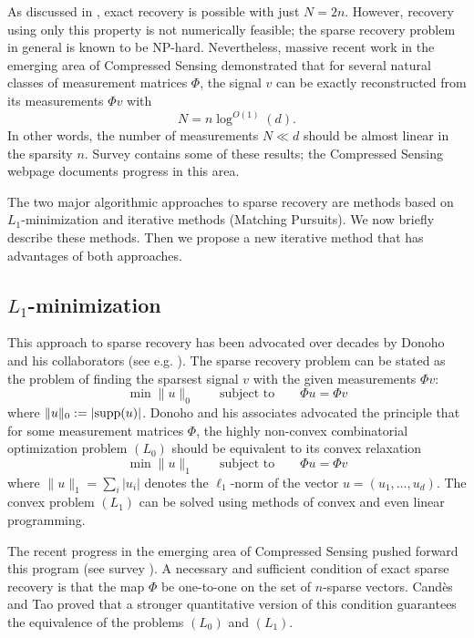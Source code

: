 \documentclass[12pt]{amsart}
\theoremstyle{plain}
\theoremstyle{definition}
\theoremstyle{remark}
\numberwithin{equation}{section}
\begin{document}
As discussed in \cite{CDD}, exact recovery is possible with just $N=2n$. However,
recovery using only this property is not numerically feasible; the sparse recovery 
problem in general is known to be NP-hard.
Nevertheless, massive recent work in the emerging area of Compressed Sensing 
demonstrated that for several natural classes of measurement matrices $\Phi$, 
the signal $v$ can be exactly reconstructed from its measurements $\Phi v$ with
\begin{equation}                    \label{N}
  N = n \log^{O(1)} (d).
\end{equation}
In other words, the number of measurements $N \ll d$ should be almost linear in 
the sparsity $n$. 
Survey \cite{C} contains some of these results; 
the Compressed Sensing webpage \cite{CS webpage} documents progress in this area.

The two major algorithmic approaches to sparse recovery are methods
based on $L_1$-minimization and iterative methods (Matching Pursuits).
We now briefly describe these methods. Then we propose a new iterative method
that has advantages of both approaches.

\subsection{$L_1$-minimization}

This approach to sparse recovery has been advocated over decades by Donoho and his 
collaborators (see e.g. \cite{D}). 
The sparse recovery problem can be stated as the problem of finding 
the sparsest signal $v$ with the given measurements $\Phi v$:
\begin{equation}                    \tag{$L_0$}
  \min \|u\|_0 \qquad \text{subject to} \qquad \Phi u = \Phi v
\end{equation}
where $\|u\|_0 := |{{\rm supp}}(u)|$.
Donoho and his associates advocated the principle
that for some measurement matrices $\Phi$, the highly non-convex 
combinatorial optimization problem $(L_0)$ should be equivalent 
to its convex relaxation 
\begin{equation}                    \tag{$L_1$}
  \min \|u\|_1 \qquad \text{subject to} \qquad \Phi u = \Phi v
\end{equation}
where $\|u\|_1 = \sum_i |u_i|$ denotes the $\ell_1$-norm of the vector
$u = (u_1,\ldots,u_d)$. The convex problem $(L_1)$ can be solved using 
methods of convex and even linear programming. 

The recent progress in the emerging area of Compressed Sensing pushed forward
this program (see survey \cite{C}). A necessary and sufficient
condition of exact sparse recovery is that the map $\Phi$ be one-to-one on the set of  
$n$-sparse vectors. Cand\`es and Tao \cite{CT decoding} proved that a stronger
quantitative version of this condition guarantees the equivalence 
of the problems $(L_0)$ and $(L_1)$.
\end{document}
